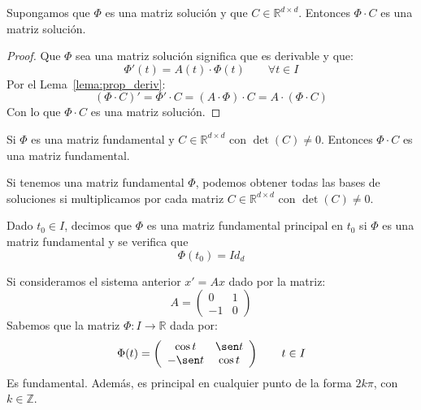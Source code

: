 \begin{prop}
    Supongamos que $\Phi$ es una matriz solución y que $C\in \mathbb{R}^{d\times d}$. Entonces $\Phi\cdot C$ es una matriz solución.
    \begin{proof}
        Que $\Phi$ sea una matriz solución significa que es derivable y que:
        \begin{equation*}
            \Phi'(t) = A(t)\cdot \Phi(t) \qquad \forall t\in I
        \end{equation*}
        Por el Lema~\ref{lema:prop_deriv}:
        \begin{equation*}
            (\Phi\cdot C)' = \Phi'\cdot C = (A\cdot \Phi)\cdot C = A\cdot (\Phi \cdot C)
        \end{equation*}
        Con lo que $\Phi\cdot C$ es una matriz solución.
    \end{proof}
\end{prop}

\begin{coro}\label{cor:matriz_fundamental}
    Si $\Phi$ es una matriz fundamental y $C\in \mathbb{R}^{d\times d}$ con $\det(C)\neq 0$. Entonces $\Phi\cdot C$ es una matriz fundamental.
\end{coro}

\begin{ejercicio*}
    Si tenemos una matriz fundamental $\Phi$, podemos obtener todas las bases de soluciones si multiplicamos por cada matriz $C\in \mathbb{R}^{d\times d}$ con $\det(C)\neq 0$.
\end{ejercicio*}

\begin{definicion}
    Dado $t_0\in I$, decimos que $\Phi$ es una matriz fundamental principal en $t_0$ si $\Phi$ es una matriz fundamental y se verifica que
    \begin{equation*}
        \Phi(t_0) = Id_{d}
    \end{equation*}
\end{definicion}

\begin{ejemplo}
    Si consideramos el sistema anterior $x' = Ax$ dado por la matriz:
    \begin{equation*}
        A = \left(\begin{array}{cc}
                0 & 1 \\
                -1 & 0
        \end{array}\right)
    \end{equation*}
    Sabemos que la matriz $\Phi:I\rightarrow\mathbb{R}$ dada por:
    \begin{equation*}
        \Phi(t) = \left(\begin{array}{cc}
                \cos t & \sen t \\
                -\sen t & \cos t
        \end{array}\right) \qquad t\in I
    \end{equation*}
    Es fundamental. Además, es principal en cualquier punto de la forma $2k\pi$, con $k\in \mathbb{Z}$.
\end{ejemplo}


